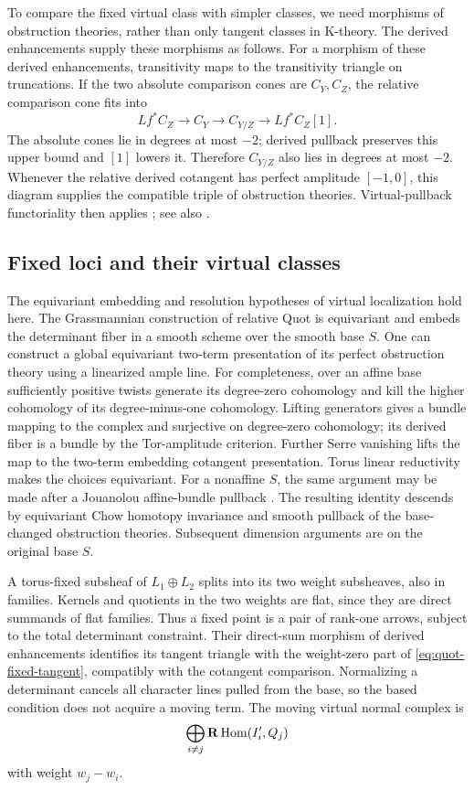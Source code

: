 To compare the fixed virtual class with simpler classes, we need
morphisms of obstruction theories, rather than only tangent classes
in K-theory.  The derived enhancements supply these morphisms as follows.
For a morphism of these derived enhancements, transitivity maps to the
transitivity triangle on truncations. If the two absolute comparison
cones are \(C_Y,C_Z\), the relative comparison cone fits into
\[
 Lf^*C_Z\longrightarrow C_Y\longrightarrow C_{Y/Z}
 \longrightarrow Lf^*C_Z[1].
\]
The absolute cones lie in degrees at most \(-2\); derived pullback
preserves this upper bound and \([1]\) lowers it.
Therefore \(C_{Y/Z}\) also lies in degrees at most \(-2\).
Whenever the relative derived cotangent has perfect amplitude
\([-1,0]\), this diagram supplies the compatible triple of obstruction
theories. Virtual-pullback functoriality then applies
\cite[Definition 4.5, Theorem 4.8, and Corollary 4.9]{Manolache};
see also \cite[Proposition 1.5]{STV}.

\subsection{Fixed loci and their virtual classes}

The equivariant embedding and resolution hypotheses of virtual
localization \cite[Section 1]{GP} hold here.
The Grassmannian construction of relative Quot is equivariant and
embeds the determinant fiber in a smooth scheme over the smooth base
\(S\). One can construct a global equivariant two-term presentation of
its perfect obstruction theory using a linearized ample line.
For completeness, over an affine base sufficiently positive twists
generate its degree-zero cohomology and kill the higher cohomology
of its degree-minus-one cohomology. Lifting generators gives a bundle
mapping to the complex and surjective on degree-zero cohomology;
its derived fiber is a bundle by the Tor-amplitude criterion.
Further Serre vanishing lifts the map to the two-term embedding
cotangent presentation. Torus linear reductivity makes the choices
equivariant.
For a nonaffine \(S\), the same argument may be made after a
Jouanolou affine-bundle pullback
\cite[Proposition~4.1.4(1)]{ADOJouanolou}. The resulting identity descends by
equivariant Chow homotopy invariance and smooth pullback of the
base-changed obstruction theories. Subsequent dimension arguments
are on the original base \(S\).

A torus-fixed subsheaf of \(L_1\oplus L_2\) splits into its two weight
subsheaves, also in families. Kernels and quotients in the two weights
are flat, since they are direct summands of flat families.
Thus a fixed point is a pair of rank-one arrows, subject to the total
determinant constraint. Their direct-sum morphism of derived
enhancements identifies its tangent triangle with the weight-zero part
of \eqref{eq:quot-fixed-tangent}, compatibly with the cotangent
comparison. Normalizing a determinant cancels all character lines
pulled from the base, so the based condition does not acquire a moving
term. The moving virtual normal complex is
\begin{equation}
\label{eq:moving-normal}
 \bigoplus_{i\ne j}\mathbf R\operatorname{Hom}(I'_i,Q_j)
\end{equation}
with weight \(w_j-w_i\).

